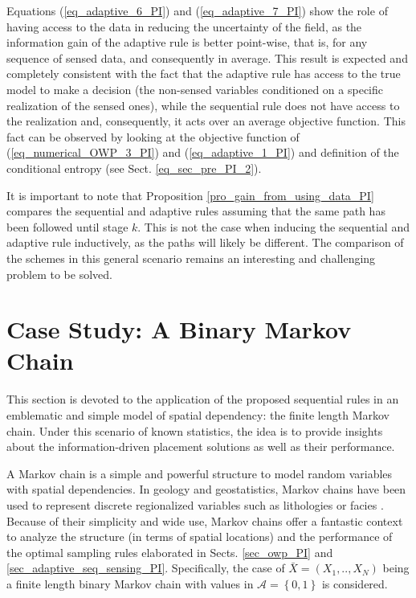 Equations (\ref{eq_adaptive_6_PI}) and (\ref{eq_adaptive_7_PI}) show the role of having access to the data in reducing the uncertainty of the field,  as the information gain of the adaptive rule is better point-wise, that is, for any sequence of sensed data, and consequently in average. This result is expected and completely consistent with the fact that the adaptive rule has access to the true model to make a decision (the non-sensed variables conditioned on a specific realization of the sensed ones), while the sequential rule does not have access to the realization and, consequently,  it acts over an average objective function. {This fact can be observed by looking at the objective function of (\ref{eq_numerical_OWP_3_PI}) and (\ref{eq_adaptive_1_PI}) and definition of the conditional entropy (see Sect. \ref{eq_sec_pre_PI_2}).}

\begin{remark}
It is important to note that Proposition \ref{pro_gain_from_using_data_PI} compares the sequential and adaptive rules assuming that the same path has been followed until stage $k$. This is not the case when inducing the sequential and adaptive rule inductively, as the paths will likely be different. The comparison of the schemes in this general scenario remains an interesting and challenging problem to be solved.
\end{remark}

\section{Case Study: A Binary Markov Chain}
\label{sec_1d_markov_PI}
This section is devoted to the application of the proposed sequential rules in an emblematic and simple model of spatial dependency: the finite length {Markov} chain. Under this scenario of known statistics, the idea is to provide insights about the information-driven placement solutions as well as their performance.  

A Markov chain is a simple and powerful structure to model random variables with spatial dependencies. In geology and geostatistics, Markov chains have been used to represent discrete regionalized variables such as lithologies or facies \citep{Elfeki2001_a,Ostroumov2005,Zhang2008_a}. Because of their simplicity and wide use, Markov chains offer a fantastic context to analyze the structure (in terms of spatial locations) and the performance of the optimal sampling rules elaborated in Sects. \ref{sec_owp_PI} and \ref{sec_adaptive_seq_sensing_PI}. Specifically, the case of $\bar{X}=(X_1,..,X_N )$ being a finite length binary Markov chain with values in $\mathcal{A}=\left\{0,1 \right\}$ is considered. 

